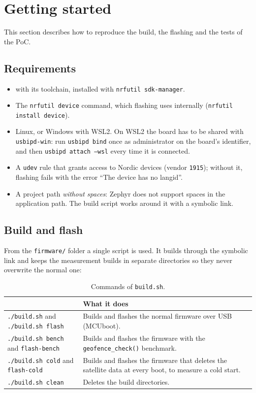 \section{Getting started}

This section describes how to reproduce the build, the flashing and the tests of the PoC.

\subsection{Requirements}

\begin{itemize}
  \item \dNcs{} with its toolchain, installed with \texttt{nrfutil sdk-manager}.
  \item The \texttt{nrfutil device} command, which flashing uses internally (\texttt{nrfutil install device}).
  \item Linux, or Windows with WSL2. On WSL2 the board has to be shared with \texttt{usbipd-win}: run
        \texttt{usbipd bind} once as administrator on the board's identifier, and then
        \texttt{usbipd attach --wsl} every time it is connected.
  \item A \texttt{udev} rule that grants access to Nordic devices (vendor \texttt{1915}); without it, flashing
        fails with the error ``The device has no langid''.
  \item A project path \emph{without spaces}: Zephyr does not support spaces in the application path. The build
        script works around it with a symbolic link.
\end{itemize}

\subsection{Build and flash}

From the \texttt{firmware/} folder a single script is used. It builds through the symbolic link and keeps the
measurement builds in separate directories so they never overwrite the normal one:

\begin{table}[H]
\centering
\small
\begin{tabularx}{\textwidth}{|l X|}
\hline
\tablehead{\textbf{Command} & \textbf{What it does}} \\ \hline
\texttt{./build.sh} and \texttt{./build.sh flash} & Builds and flashes the normal firmware over USB (MCUboot). \\ \hline
\texttt{./build.sh bench} and \texttt{flash-bench} & Builds and flashes the firmware with the \texttt{geofence\_check()} benchmark. \\ \hline
\texttt{./build.sh cold} and \texttt{flash-cold} & Builds and flashes the firmware that deletes the satellite data at every boot, to measure a cold start. \\ \hline
\texttt{./build.sh clean} & Deletes the build directories. \\ \hline
\end{tabularx}
\caption{Commands of \texttt{build.sh}.}
\end{table}

